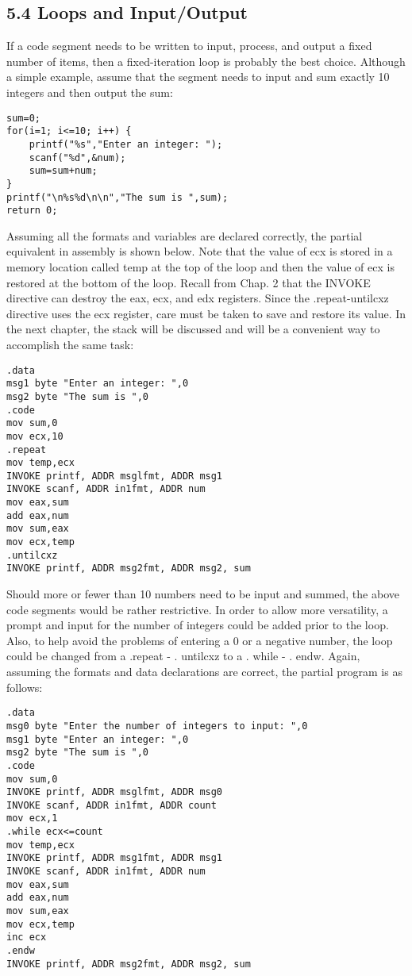 \documentclass[10pt]{article}
\begin{document}
\subsection*{5.4 Loops and Input/Output}
If a code segment needs to be written to input, process, and output a fixed number of items, then a fixed-iteration loop is probably the best choice. Although a simple example, assume that the segment needs to input and sum exactly 10 integers and then output the sum:

\begin{verbatim}
sum=0;
for(i=1; i<=10; i++) {
    printf("%s","Enter an integer: ");
    scanf("%d",&num);
    sum=sum+num;
}
printf("\n%s%d\n\n","The sum is ",sum);
return 0;
\end{verbatim}

Assuming all the formats and variables are declared correctly, the partial equivalent in assembly is shown below. Note that the value of ecx is stored in a memory location called temp at the top of the loop and then the value of ecx is restored at the bottom of the loop. Recall from Chap. 2 that the INVOKE directive can destroy the eax, ecx, and edx registers. Since the .repeat-untilcxz directive uses the ecx register, care must be taken to save and restore its value. In the next chapter, the stack will be discussed and will be a convenient way to accomplish the same task:

\begin{verbatim}
.data
msg1 byte "Enter an integer: ",0
msg2 byte "The sum is ",0
.code
mov sum,0
mov ecx,10
.repeat
mov temp,ecx
INVOKE printf, ADDR msglfmt, ADDR msg1
INVOKE scanf, ADDR in1fmt, ADDR num
mov eax,sum
add eax,num
mov sum,eax
mov ecx,temp
.untilcxz
INVOKE printf, ADDR msg2fmt, ADDR msg2, sum
\end{verbatim}

Should more or fewer than 10 numbers need to be input and summed, the above code segments would be rather restrictive. In order to allow more versatility, a prompt and input for the number of integers could be added prior to the loop. Also, to help avoid the problems of entering a 0 or a negative number, the loop could be changed from a .repeat - . untilcxz to a . while - . endw. Again, assuming the formats and data declarations are correct, the partial program is as follows:

\begin{verbatim}
.data
msg0 byte "Enter the number of integers to input: ",0
msg1 byte "Enter an integer: ",0
msg2 byte "The sum is ",0
.code
mov sum,0
INVOKE printf, ADDR msglfmt, ADDR msg0
INVOKE scanf, ADDR in1fmt, ADDR count
mov ecx,1
.while ecx<=count
mov temp,ecx
INVOKE printf, ADDR msg1fmt, ADDR msg1
INVOKE scanf, ADDR in1fmt, ADDR num
mov eax,sum
add eax,num
mov sum,eax
mov ecx,temp
inc ecx
.endw
INVOKE printf, ADDR msg2fmt, ADDR msg2, sum
\end{verbatim}
\end{document}

